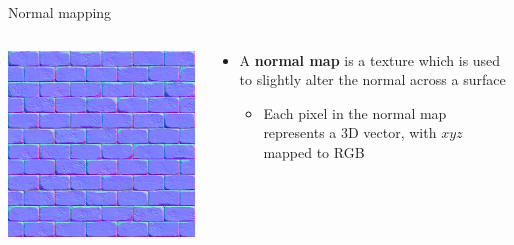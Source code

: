 \begin{frame}{Normal mapping}
	\pause
	\begin{columns}
		\begin{column}{0.33\textwidth}
			\includegraphics[width=\textwidth]{normal_map}
		\end{column}
		\begin{column}{0.65\textwidth}
			\begin{itemize}
				\item A \textbf{normal map} is a texture which is used to slightly alter the normal
					across a surface
					\begin{itemize}
						\pause\item Each pixel in the normal map represents a 3D vector, with $xyz$ mapped to RGB
					\end{itemize}
			\end{itemize}
		\end{column}
	\end{columns}
	\pause
	\begin{columns}
		\begin{column}{0.33\textwidth}

\end{column}
\end{columns}
\end{frame}

